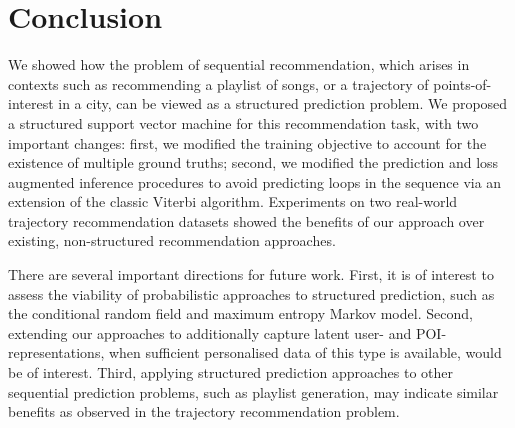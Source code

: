 
\section{Conclusion}

We showed how the problem of sequential recommendation,
which arises in contexts such as
recommending a playlist of songs, or a trajectory of points-of-interest in a city,
can be viewed as a structured prediction problem.
We proposed a structured support vector machine for this recommendation task, with two important changes:
first, we modified the training objective to account for the existence of multiple ground truths;
second, we modified the prediction and loss augmented inference procedures to avoid predicting loops in the sequence via an extension of the classic Viterbi algorithm.
Experiments on two real-world trajectory recommendation datasets showed the benefits of our approach over existing, non-structured recommendation approaches.

There are several important directions for future work.
First, it is of interest to assess the viability of probabilistic approaches to structured prediction,
such as the conditional random field and maximum entropy Markov model.
Second, extending our approaches to additionally capture latent user- and POI-representations, when sufficient personalised data of this type is available, would be of interest.
Third, applying structured prediction approaches to other sequential prediction problems, such as playlist generation, may indicate similar benefits as observed in the trajectory recommendation problem.
